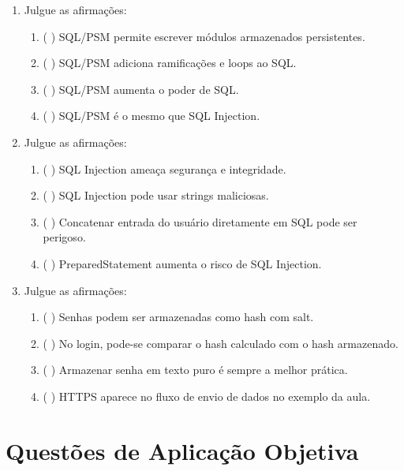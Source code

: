 \documentclass[12pt,a4paper]{article}
\begin{document}
\begin{enumerate}[resume,label=\textbf{Q\arabic*.}]
\item Julgue as afirmações:

\begin{enumerate}[label=\alph*)]
    \item ( \quad ) SQL/PSM permite escrever módulos armazenados persistentes.
    \item ( \quad ) SQL/PSM adiciona ramificações e loops ao SQL.
    \item ( \quad ) SQL/PSM aumenta o poder de SQL.
    \item ( \quad ) SQL/PSM é o mesmo que SQL Injection.
\end{enumerate}

\item Julgue as afirmações:

\begin{enumerate}[label=\alph*)]
    \item ( \quad ) SQL Injection ameaça segurança e integridade.
    \item ( \quad ) SQL Injection pode usar strings maliciosas.
    \item ( \quad ) Concatenar entrada do usuário diretamente em SQL pode ser perigoso.
    \item ( \quad ) PreparedStatement aumenta o risco de SQL Injection.
\end{enumerate}

\item Julgue as afirmações:

\begin{enumerate}[label=\alph*)]
    \item ( \quad ) Senhas podem ser armazenadas como hash com salt.
    \item ( \quad ) No login, pode-se comparar o hash calculado com o hash armazenado.
    \item ( \quad ) Armazenar senha em texto puro é sempre a melhor prática.
    \item ( \quad ) HTTPS aparece no fluxo de envio de dados no exemplo da aula.
\end{enumerate}

\end{enumerate}

\section{Questões de Aplicação Objetiva}
\end{document}
